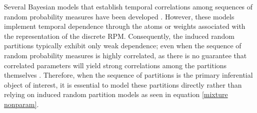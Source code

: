 \documentclass[12pt,	%
	a4paper,		%
	twoside,		%
	openright,		%
	titlepage,%
	]{book}
\theoremstyle{definition}
\let\cite\citep
\begin{document}
Several Bayesian models that establish temporal correlations among sequences of random probability measures have been developed \cite{stick-br1} \cite{stick-br2} \cite{stick-br3} \cite{stick-br4} \cite{stick-br5} \cite{stick-br6} \cite{stick-br7} \cite{polya-competitor}. However, these models implement temporal dependence through the atoms or weights associated with the representation of the discrete RPM. Consequently, the induced random partitions typically exhibit only weak dependence; even when the sequence of random probability measures is highly correlated, as there is no guarantee that correlated parameters will yield strong correlations among the partitions themselves \cite{1-drpm}. Therefore, when the sequence of partitions is the primary inferential object of interest, it is essential to model these partitions directly rather than relying on induced random partition models as seen in equation \eqref{mixture nonparam}.


\end{document}
